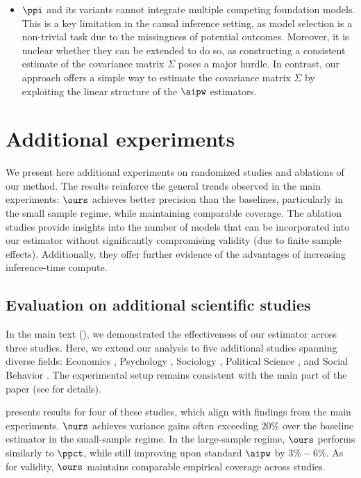 \begin{itemize}
     \item \(\ppi\) and its variants cannot integrate multiple competing foundation models. This is a key limitation in the causal inference setting, as model selection is a non-trivial task due to the missingness of potential outcomes. Moreover, it is unclear whether they can be extended to do so, as constructing a consistent estimate of the covariance matrix \(\Sigma\) poses a major hurdle. In contrast, our approach offers a simple way to estimate the covariance matrix $\Sigma$ by exploiting the linear structure of the \(\aipw\) estimators.
     \end{itemize}




\newpage
\section{Additional experiments}
We present here additional experiments on randomized studies and ablations of our method. The results reinforce the general trends observed in the main experiments: $\ours$ achieves better precision than the baselines, particularly in the small sample regime, while maintaining comparable coverage. The ablation studies provide insights into the number of models that can be incorporated into our estimator without significantly compromising validity (due to finite sample effects). Additionally, they offer further evidence of the advantages of increasing inference-time compute.

\subsection{Evaluation on additional scientific studies}
\label{apx:more_studies}

In the main text (), we demonstrated the effectiveness of our estimator across three studies. Here, we extend our analysis to five additional studies spanning diverse fields: Economics \cite{haaland2023beliefs}, Psychology \cite{brandt2013onset}, Sociology \cite{caprariello2013have}, Political Science \cite{fahey2023principled}, and Social Behavior \cite{shuman2024defend}. The experimental setup remains consistent with the main part of the paper (see  for details).

 presents results for four of these studies, which align with findings from the main experiments. $\ours$ achieves variance gains often exceeding $20\%$ over the baseline estimator in the small-sample regime. In the large-sample regime, $\ours$ performs similarly to $\ppct$, while still improving upon standard $\aipw$ by $3\%-6\%$. As for validity, $\ours$ maintains comparable empirical coverage across studies.


